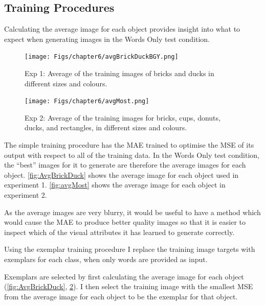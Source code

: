 
\subsection{Training Procedures}

Calculating the average image for each object provides insight into what to expect when generating images in the Words Only test condition.


\begin{figure}[ht]
    \centering
    \texttt{[image: Figs/chapter6/avgBrickDuckBGY.png]}
    \caption{Exp 1: Average of the training images of bricks and ducks in different sizes and colours.}
    \label{fig:AvgBrickDuck}
\end{figure}

\begin{figure}[ht]
    \centering
    \texttt{[image: Figs/chapter6/avgMost.png]}
    \caption{Exp 2: Average of the training images for bricks, cups, donuts, ducks, and rectangles, in different sizes and colours.}
    \label{fig:avgMost}
\end{figure}

The simple training procedure has the MAE trained to optimise the \ac{MSE} of its output with respect to all of the training data. In the Words Only test condition, the ``best'' images for it to generate are therefore the average images for each object. \autoref{fig:AvgBrickDuck} shows the average image for each object used in experiment 1. \autoref{fig:avgMost} shows the average image for each object in experiment 2.

As the average images are very blurry, it would be useful to have a method which would cause the \ac{MAE} to produce better quality images so that it is easier to inspect which of the visual attributes it has learned to generate correctly.

Using the exemplar training procedure I replace the training image targets with exemplars for each class, when only words are provided as input.

Exemplars are selected by first calculating the average image for each object (\autoref{fig:AvgBrickDuck}, \ref{fig:avgMost}). I then select the training image with the smallest \ac{MSE} from the average image for each object to be the exemplar for that object. 

